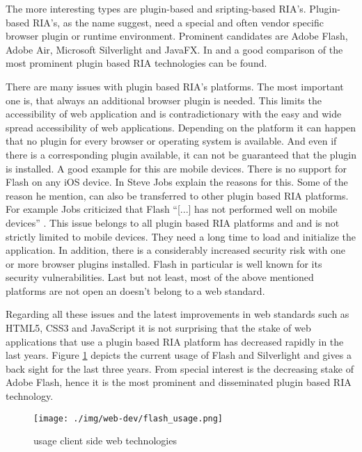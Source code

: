 The more interesting types are plugin-based and sripting-based RIA's.
Plugin-based RIA's, as the name suggest, need a special and often vendor specific browser plugin or runtime environment.
Prominent candidates are Adobe Flash, Adobe Air, Microsoft Silverlight and JavaFX.
In \autocite[]{ria-comp-1} and \autocite[]{ria-comp-2} a good comparison of the most prominent plugin based RIA technologies can be found.

There are many issues with plugin based RIA's platforms.
The most important one is, that always an additional browser plugin is needed.
This limits the accessibility of web application and is contradictionary with the easy and wide spread accessibility of web applications.
Depending on the platform it can happen that no plugin for every browser or operating system is available.
And even if there is a corresponding plugin available, it can not be guaranteed that the plugin is installed.
A good example for this are mobile devices.
There is no support for Flash on any iOS device.
In \autocite[]{jobs-thoughts-on-flash} Steve Jobs explain the reasons for this.
Some of the reason he mention, can also be transferred to other plugin based RIA platforms. 
For example Jobs criticized that Flash \enquote{[...] has not performed well on mobile devices} \autocite[]{jobs-thoughts-on-flash}.
This issue belongs to all plugin based RIA platforms and and is not strictly limited to mobile devices.
They need a long time to load and initialize the application.
In addition, there is a considerably increased security risk with one or more browser plugins installed.
Flash in particular is well known for its security vulnerabilities.
Last but not least, most of the above mentioned platforms are not open an doesn't belong to a web standard. 

Regarding all these issues and the latest improvements in web standards such as HTML5, CSS3 and JavaScript it is not surprising that the stake of web applications that use a plugin based RIA platform has decreased rapidly in the last years.
Figure \ref{fig:flash_usage} depicts the current usage of Flash and Silverlight and gives a back sight for the last three years.
From special interest is the decreasing stake of Adobe Flash, hence it is the most prominent and disseminated plugin based RIA technology.

\begin{figure}
	\centering \texttt{[image: ./img/web-dev/flash\_usage.png]}
	\caption{usage client side web technologies \autocite[]{ria_flash-usage}}
	\label{fig:flash_usage}
\end{figure}

